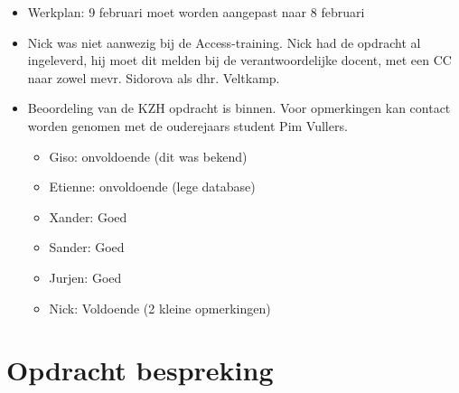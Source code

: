 \documentclass[]{article}
\begin{document}
  \begin{itemize}
     \item Werkplan: 9 februari moet worden aangepast naar 8 februari
     \item Nick was niet aanwezig bij de Access-training. Nick had de opdracht al ingeleverd, hij moet dit melden bij de verantwoordelijke docent, met een CC naar zowel mevr. Sidorova als dhr. Veltkamp.
     \item Beoordeling van de KZH opdracht is binnen. Voor opmerkingen kan contact worden genomen met  de ouderejaars student Pim Vullers.
		\begin{itemize}
			\item Giso: onvoldoende (dit was bekend)
			\item Etienne: onvoldoende (lege database)
			\item Xander: Goed
			\item Sander: Goed
			\item Jurjen: Goed
			\item Nick: Voldoende (2 kleine opmerkingen)
		\end{itemize}
  \end{itemize}







\section{Opdracht bespreking}
\end{document}
